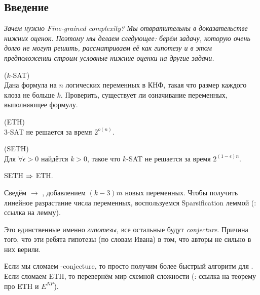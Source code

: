 
\subsection{Введение}

\textit{Зачем нужно Fine-grained complexity? Мы отвратительны в доказательстве нижних оценок. Поэтому мы делаем следующее: берём задачу, которую очень долго не могут решить, рассматриваем её как гипотезу и в этом предположении строим условные нижние оценки на другие задачи.}

\begin{problem}($k$-SAT)\\
   Дана формула на $n$ логических переменных в КНФ, такая что размер каждого клоза не больше $k$. Проверить, существует ли означивание переменных, выполняющее формулу.
\end{problem}

\begin{hypothesis}(ETH)~\cite{Impagliazzo2001}\\
   $3$-SAT не решается за время $2^{o(n)}$.
\end{hypothesis}

\begin{hypothesis}(SETH)~\cite{Impagliazzo2001}\\
   Для $\forall \epsilon > 0$ найдётся $k > 0$, такое что $k$-SAT не решается за время $2^{(1-\epsilon)n}$.
\end{hypothesis}

\begin{statement}
    SETH $\Rightarrow$ ETH.
\end{statement}

\begin{proof1}
    Сведём  $\to$ , добавлением $(k - 3) m$ новых переменных. Чтобы получить линейное разрастание числа переменных, воспользуемся Sparsification леммой (\TODO: ссылка на лемму).
\end{proof1}

\begin{remark}
    Это единственные именно \textit{гипотезы}, все остальные будут \textit{conjecture}. Причина того, что эти ребята гипотезы (по словам Ивана) в том, что авторы не сильно в них верили.
\end{remark}

\begin{remark}
    Если мы сломаем -conjecture, то просто получим более быстрый алгоритм для . Если сломаем ETH, то перевернём мир схемной сложности (\TODO: ссылка на теорему про ETH и $E^{NP}$).
\end{remark}

